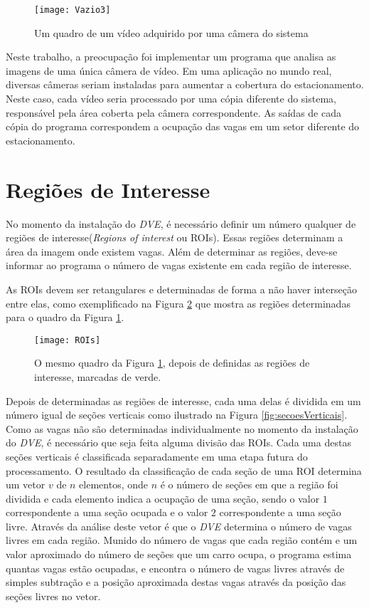 \begin{figure}[!ht]
	\centering
	\texttt{[image: Vazio3]}
	\caption{Um quadro de um vídeo adquirido por uma câmera do sistema}
	\label{fig:aquisicao}
	\centering
\end{figure}

Neste trabalho, a preocupação foi implementar um programa que analisa as imagens de uma única câmera de vídeo. Em uma aplicação no mundo real, diversas câmeras seriam instaladas para aumentar a cobertura do estacionamento. Neste caso, cada vídeo seria processado por uma cópia diferente do sistema, responsável pela área coberta pela câmera correspondente. As saídas de cada cópia do programa correspondem a ocupação das vagas em um setor diferente do estacionamento.

\section{Regiões de Interesse}\label{sec:ROIs}

No momento da instalação do \textit{DVE}, é necessário definir um número qualquer de regiões de interesse(\textit{Regions of interest} ou ROIs). Essas regiões determinam a área da imagem onde existem vagas. Além de determinar as regiões, deve-se informar ao programa o número de vagas existente em cada região de interesse.

As ROIs devem ser retangulares e determinadas de forma a não haver interseção entre elas, como exemplificado na Figura \ref{fig:ROIs} que mostra as regiões determinadas para o quadro da Figura \ref{fig:aquisicao}.

\begin{figure}
	\centering
	\texttt{[image: ROIs]}
	\caption{O mesmo quadro da Figura \ref{fig:aquisicao}, depois de definidas as regiões de interesse, marcadas de verde.}
	\label{fig:ROIs}
	\centering
\end{figure}

Depois de determinadas as regiões de interesse, cada uma delas é dividida em um número igual de seções verticais como ilustrado na Figura \ref{fig:secoesVerticais}. Como as vagas não são determinadas individualmente no momento da instalação do \textit{DVE}, é necessário que seja feita alguma divisão das ROIs. Cada uma destas seções verticais é classificada separadamente em uma etapa futura do processamento. O resultado da classificação de cada seção de uma ROI determina um vetor $v$ de $n$ elementos, onde $n$ é o número de seções em que a região foi dividida e cada elemento indica a ocupação de uma seção, sendo o valor $1$ correspondente a uma seção ocupada e o valor $2$ correspondente a uma seção livre. Através da análise deste vetor é que o \textit{DVE} determina o número de vagas livres em cada região. Munido do número de vagas que cada região contém e um valor aproximado do número de seções que um carro ocupa, o programa estima quantas vagas estão ocupadas, e encontra o número de vagas livres através de simples subtração e a posição aproximada destas vagas através da posição das seções livres no vetor.

